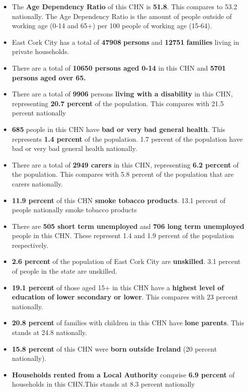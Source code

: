 \documentclass{article}
\begin{document}
\begin{itemize}

\item The \textbf{Age Dependency Ratio} of this CHN is  \textbf{51.8}. This compares to 53.2 nationally. The Age Dependency Ratio is the amount of people outside of working age (0-14 and 65+) per 100 people of working age (15-64). 

\item East Cork City has a total of \textbf{\num{47908}} \textbf{persons} and  \textbf{\num{12751}} \textbf{families} living in private households.

\item There are a total of \textbf{\num{10650} persons aged 0-14} in this CHN and \textbf{\num{5701} persons aged over 65.} 

\item There are a total of \textbf{\num{9906}} persons \textbf{living with a disability} in this CHN, representing \textbf{20.7 percent} of the population. This compares with  21.5 percent nationally

\item \textbf{\num{685}} people in this CHN have \textbf{bad or very bad general health}. This represents \textbf{1.4 percent} of the population. 1.7 percent of the population have bad or very bad general health nationally. 

\item There are a total of \textbf{\num{2949} carers} in this CHN, representing \textbf{6.2 percent} of the population. This compares with 5.8 percent of the population that are carers nationally. 

\item \textbf{11.9 percent} of this CHN \textbf{smoke tobacco products}. 13.1 percent of people nationally smoke tobacco products

\item There are \textbf{\num{505} short term unemployed} and \textbf{\num{706} long term unemployed} people in this CHN. These represent 1.4 and 1.9 percent of the population respectively.

\item  \textbf{2.6 percent} of the population of East Cork City are \textbf{unskilled}. 3.1 percent of people in the state are unskilled.

\item \textbf{19.1 percent} of those aged 15+ in this CHN have a \textbf{highest level of education of lower secondary or lower}. This compares with 23 percent nationally. 

\item \textbf{20.8 percent} of families with children in this CHN have \textbf{lone parents}. This stands at 24.8 nationally.

\item \textbf{15.8 percent} of this CHN were \textbf{born outside Ireland} (20 percent nationally).

\item \textbf{Households rented from a Local Authority} comprise \textbf{6.9 percent} of households in this CHN.This stands at 8.3 percent nationally

\end{itemize}
\end{document}
